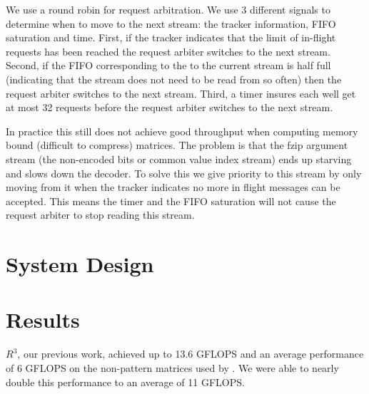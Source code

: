 We use a round robin for request arbitration. We use 3 different signals to determine when to move to the next stream: the tracker information, FIFO saturation and time. First, if the tracker indicates that the limit of in-flight requests has been reached the request arbiter switches to the next stream. Second, if the FIFO corresponding to the to the current stream is half full (indicating that the stream does not need to be read from so often) then the request arbiter switches to the next stream. Third, a timer insures each well get at most 32 requests before the request arbiter switches to the next stream.

\par In practice this still does not achieve good throughput when computing memory bound (difficult to compress) matrices. The problem is that the fzip argument stream (the non-encoded bits or common value index stream) ends up starving and slows down the decoder. To solve this we give priority to this stream by only moving from it when the tracker indicates no more in flight messages can be accepted. This means the timer and the FIFO saturation will not cause the request arbiter to stop reading this stream.
\section{System Design}
\section{Results}
$R^3$, our previous work, achieved up to 13.6 GFLOPS and an average performance of 6 GFLOPS on the non-pattern matrices used by \cite{prelim:bell}. We were able to nearly double this performance to an average of 11 GFLOPS.

